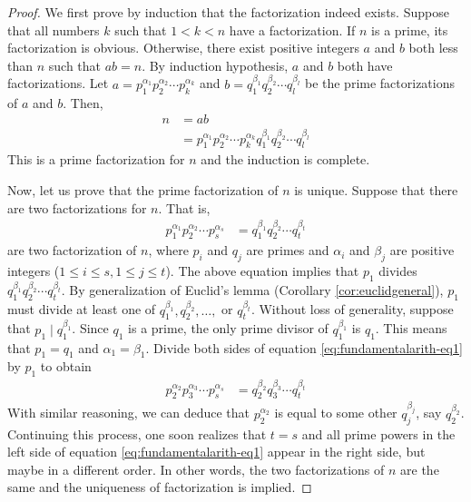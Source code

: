 \documentclass{subfile}
\begin{document}
	\begin{proof}
		We first prove by induction that the factorization indeed exists. Suppose that all numbers $k$ such that $1<k<n$ have a factorization. If $n$ is a prime, its factorization is obvious. Otherwise, there exist positive integers $a$ and $b$ both less than $n$ such that $ab=n$. By induction hypothesis, $a$ and $b$ both have factorizations. Let $a=p_1^{\alpha_1}p_2^{\alpha_2}\cdots p_k^{\alpha_k}$ and $b=q_1^{\beta_1}q_2^{\beta_2}\cdots q_l^{\beta_l}$ be the prime factorizations of $a$ and $b$. Then,
		\begin{align*}
			n
				& = ab\\
				& = p_1^{\alpha_1}p_2^{\alpha_2}\cdots p_k^{\alpha_k}q_1^{\beta_1}q_2^{\beta_2}\cdots q_l^{\beta_l}
		\end{align*}
		This is a prime factorization for $n$ and the induction is complete.

		Now, let us prove that the prime factorization of $n$ is unique. Suppose that there are two factorizations for $n$. That is,
		\begin{align}
			p_1^{\alpha_1}p_2^{\alpha_2}\cdots p_s^{\alpha_s}
				& =q_1^{\beta_1}q_2^{\beta_2}\cdots q_t^{\beta_t} \label{eq:fundamentalarith-eq1}
		\end{align}
		are two factorization of $n$, where $p_i$ and $q_j$ are primes and $\alpha_i$ and $\beta_j$ are positive integers ($1 \leq i \leq s, 1 \leq j \leq t$). The above equation implies that $p_1$ divides $q_1^{\beta_1}q_2^{\beta_2}\cdots q_t^{\beta_t}$. By generalization of Euclid's lemma (Corollary \eqref{cor:euclidgeneral}), $p_1$ must divide at least one of $q_1^{\beta_1},q_2^{\beta_2},\dots,$ or $q_t^{\beta_t}$. Without loss of generality, suppose that $p_1\mid q_1^{\beta_1}$. Since $q_1$ is a prime, the only prime divisor of $q_1^{\beta_1}$ is $q_1$. This means that $p_1=q_1$ and $\alpha_1=\beta_1$. Divide both sides of equation \eqref{eq:fundamentalarith-eq1} by $p_1$ to obtain
		\begin{align*}
			p_2^{\alpha_2}p_3^{\alpha_3}\cdots p_s^{\alpha_s}
				& =q_2^{\beta_2}q_3^{\beta_3}\cdots q_t^{\beta_t}
		\end{align*}
		With similar reasoning, we can deduce that $p_2^{\alpha_2}$ is equal to some other $q_j^{\beta_j}$, say $q_{2}^{\beta_2}$. Continuing this process, one soon realizes that $t=s$ and all prime powers in the left side of equation \eqref{eq:fundamentalarith-eq1} appear in the right side, but maybe in a different order. In other words, the two factorizations of $n$ are the same and the uniqueness of factorization is implied.
	\end{proof}
\end{document}
